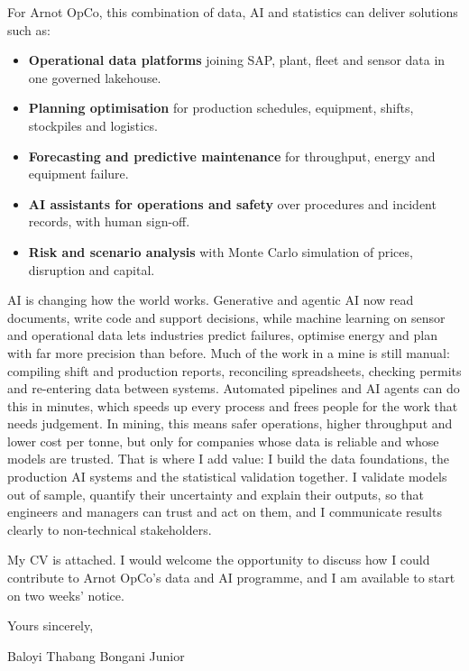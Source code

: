 \documentclass[a4paper,11pt]{article}
\begin{document}
For Arnot OpCo, this combination of data, AI and statistics can deliver solutions such as:
\begin{itemize}[leftmargin=0.2in,itemsep=1pt,topsep=0pt]
    \item \textbf{Operational data platforms} joining SAP, plant, fleet and sensor data in one governed lakehouse.
    \item \textbf{Planning optimisation} for production schedules, equipment, shifts, stockpiles and logistics.
    \item \textbf{Forecasting and predictive maintenance} for throughput, energy and equipment failure.
    \item \textbf{AI assistants for operations and safety} over procedures and incident records, with human sign-off.
    \item \textbf{Risk and scenario analysis} with Monte Carlo simulation of prices, disruption and capital.
\end{itemize}

AI is changing how the world works. Generative and agentic AI now read documents, write code and
support decisions, while machine learning on sensor and operational data lets industries predict
failures, optimise energy and plan with far more precision than before. Much of the work in a mine is
still manual: compiling shift and production reports, reconciling spreadsheets, checking permits and
re-entering data between systems. Automated pipelines and AI agents can do this in minutes, which speeds
up every process and frees people for the work that needs judgement. In mining, this means safer
operations, higher throughput and lower cost per tonne, but only for companies whose data is reliable
and whose models are trusted. That is where I add value: I build the data foundations, the production
AI systems and the statistical validation together. I validate models out of sample, quantify their
uncertainty and explain their outputs, so that engineers and managers can trust and act on them, and
I communicate results clearly to non-technical stakeholders.

My CV is attached. I would welcome the opportunity to discuss how I could contribute to Arnot OpCo's data and
AI programme, and I am available to start on two weeks' notice.

Yours sincerely,

\vspace{2pt}
Baloyi Thabang Bongani Junior
\end{document}
